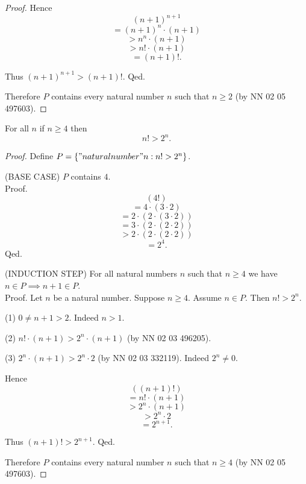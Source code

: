 \documentclass[../../natural-numbers.ftl.tex]{subfiles}
\begin{document}
\begin{forthel}
\begin{proof}
        Hence
        $$  (n + 1)^{n + 1}$$
        $$= (n + 1)^{n} \cdot (n + 1)$$
        $$> n^{n} \cdot (n + 1)$$
        $$> n! \cdot (n + 1)$$
        $$= (n + 1)!.$$

        Thus $(n + 1)^{n + 1} > (n + 1)!$.
      Qed.

      Therefore $P$ contains every natural number $n$ such that $n \geq 2$ (by NN 02 05 497603).
    \end{proof}


    \begin{proposition}[NN 02 06 493411]
      For all $n$ if $n \geq 4$ then
      $$n! > 2^{n}.$$
    \end{proposition}
    \begin{proof}
      Define $P = \{ "natural number" n : n! > 2^{n} \}$.

      (BASE CASE) $P$ contains $4$. \\
      Proof.
        $$  (4!)$$
        $$= 4 \cdot (3 \cdot 2)$$
        $$= 2 \cdot (2 \cdot (3 \cdot 2))$$
        $$= 3 \cdot (2 \cdot (2 \cdot 2))$$
        $$> 2 \cdot (2 \cdot (2 \cdot 2))$$
        $$= 2^{4}.$$
      Qed.

      (INDUCTION STEP) For all natural numbers $n$ such that $n \geq 4$ we have $n \in P \implies n + 1 \in P$. \\
      Proof.
        Let $n$ be a natural number.
        Suppose $n \geq 4$.
        Assume $n \in P$.
        Then $n! > 2^{n}$.

        (1) $0 \neq n + 1 > 2$.
        Indeed $n > 1$.

        (2) $n! \cdot (n + 1) > 2^{n} \cdot (n + 1)$ (by NN 02 03 496205).

        (3) $2^{n} \cdot (n + 1) > 2^{n} \cdot 2$ (by NN 02 03 332119).
        Indeed $2^{n} \neq 0$.

        Hence
        $$  ((n + 1)!)$$
        $$= n! \cdot (n + 1)$$
        $$> 2^{n} \cdot (n + 1)$$
        $$> 2^{n} \cdot 2$$
        $$= 2^{n + 1}.$$

        Thus $(n + 1)! > 2^{n + 1}$.
      Qed.

      Therefore $P$ contains every natural number $n$ such that $n \geq 4$ (by NN 02 05 497603).
    \end{proof}
  \end{forthel}
\end{document}
